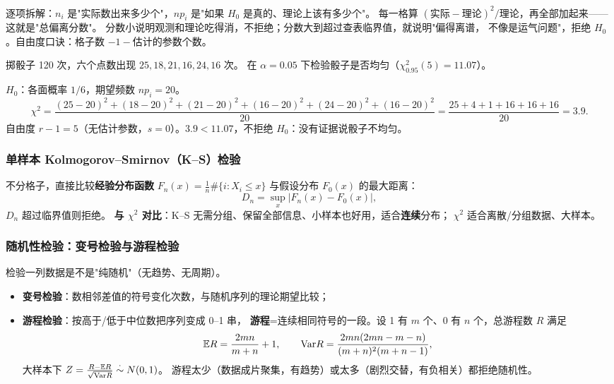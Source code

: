 \begin{pbox}
逐项拆解：$n_i$ 是"实际数出来多少个"，$np_i$ 是"如果 $H_0$ 是真的、理论上该有多少个"。
每一格算 $(\text{实际}-\text{理论})^2/\text{理论}$，再全部加起来——这就是"总偏离分数"。
分数小说明观测和理论吃得消，不拒绝；分数大到超过查表临界值，就说明"偏得离谱，
不像是运气问题"，拒绝 $H_0$。自由度口诀：格子数 $-1-$估计的参数个数。
\end{pbox}

\begin{exbox}[骰子均匀吗？]
掷骰子 120 次，六个点数出现 $25,18,21,16,24,16$ 次。
在 $\alpha=0.05$ 下检验骰子是否均匀（$\chi^2_{0.95}(5)=11.07$）。
\end{exbox}
\begin{sol}
$H_0$：各面概率 $1/6$，期望频数 $np_i=20$。
\[
\chi^2=\frac{(25-20)^2+(18-20)^2+(21-20)^2+(16-20)^2+(24-20)^2+(16-20)^2}{20}
=\frac{25+4+1+16+16+16}{20}=3.9 .
\]
自由度 $r-1=5$（无估计参数，$s=0$）。$3.9<11.07$，不拒绝 $H_0$：没有证据说骰子不均匀。
\end{sol}

\subsubsection{单样本 Kolmogorov--Smirnov（K--S）检验}

不分格子，直接比较\textbf{经验分布函数} $F_n(x)=\frac1n\#\{i:X_i\le x\}$
与假设分布 $F_0(x)$ 的最大距离：
\[
D_n=\sup_x|F_n(x)-F_0(x)| ,
\]
$D_n$ 超过临界值则拒绝。
\textbf{与 $\chi^2$ 对比}：K--S 无需分组、保留全部信息、小样本也好用，适合\textbf{连续}分布；
$\chi^2$ 适合离散/分组数据、大样本。

\subsubsection{随机性检验：变号检验与游程检验}

检验一列数据是不是"纯随机"（无趋势、无周期）。
\begin{itemize}[leftmargin=2em]
  \item \textbf{变号检验}：数相邻差值的符号变化次数，与随机序列的理论期望比较；
  \item \textbf{游程检验}：按高于/低于中位数把序列变成 0--1 串，
  \textbf{游程}=连续相同符号的一段。设 1 有 $m$ 个、0 有 $n$ 个，总游程数 $R$ 满足
  \[
  \mathbb{E} R=\frac{2mn}{m+n}+1,\qquad
  \mathrm{Var} R=\frac{2mn(2mn-m-n)}{(m+n)^2(m+n-1)},
  \]
  大样本下 $Z=\frac{R-\mathbb{E} R}{\sqrt{\mathrm{Var} R}}\overset{\cdot}{\sim}N(0,1)$。
  游程太少（数据成片聚集，有趋势）或太多（剧烈交替，有负相关）都拒绝随机性。
\end{itemize}

